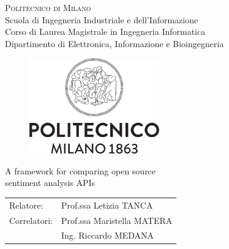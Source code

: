 \begin{titlepage}

\begin{center}
\Large{\textsc{Politecnico di Milano}}\\
\Large{Scuola di Ingegneria Industriale e dell'Informazione}\\
\large{Corso di Laurea Magistrale in Ingegneria Informatica}\\
\large{Dipartimento di Elettronica, Informazione e Bioingegneria}
\par\end{center}

\vspace{0.5cm}


\begin{center}
\begin{figure}[h]
\centering{}\includegraphics[width=0.5\textwidth]{00-frontpage/logo-polimi.png}
\end{figure}
\vspace{1cm}

\par\end{center}

\begin{center}
\LARGE{A framework for comparing open source\\ sentiment analysis APIs}\vspace{2cm}

\par\end{center}

\begin{flushleft}
\begin{tabular}{ll}
Relatore:  & Prof.ssa Letizia TANCA\tabularnewline
Correlatori:
	& Prof.ssa Maristella MATERA\tabularnewline
	& Ing. Riccardo MEDANA
\end{tabular}\vspace{1cm}

\par\end{flushleft}


\end{titlepage}
